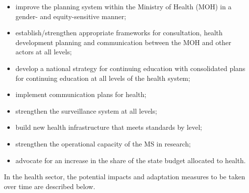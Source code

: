 \documentclass[
]{book}
\begin{document}
\begin{itemize}
\item
  improve the planning system within the Ministry of Health (MOH) in a gender- and equity-sensitive manner;
\item
  establish/strengthen appropriate frameworks for consultation, health development planning and communication between the MOH and other actors at all levels;
\item
  develop a national strategy for continuing education with consolidated plans for continuing education at all levels of the health system;
\item
  implement communication plans for health;
\item
  strengthen the surveillance system at all levels;
\item
  build new health infrastructure that meets standards by level;
\item
  strengthen the operational capacity of the MS in research;
\item
  advocate for an increase in the share of the state budget allocated to health.
\end{itemize}

In the health sector, the potential impacts and adaptation measures to be taken over time are described below.
\end{document}
